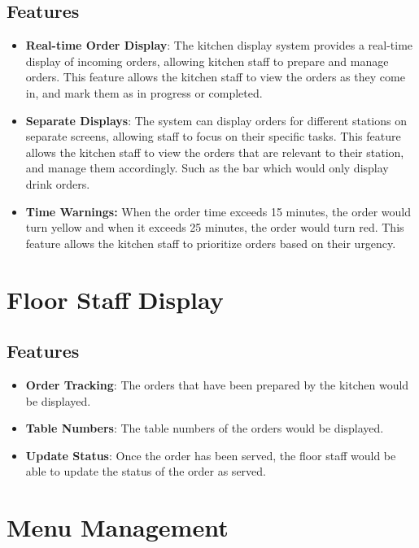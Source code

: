 \subsection{Features}
\begin{itemize}
    \item \textbf{Real-time Order Display}: The kitchen display system provides a real-time display of incoming orders, allowing kitchen staff to prepare and manage orders. This feature allows the kitchen staff to view the orders as they come in, and mark them as in progress or completed.
    \item \textbf{Separate Displays}: The system can display orders for different stations on separate screens, allowing staff to focus on their specific tasks. This feature allows the kitchen staff to view the orders that are relevant to their station, and manage them accordingly. Such as the bar which would only display drink orders.
    \item \textbf{Time Warnings:} When the order time exceeds 15 minutes, the order would turn yellow and when it exceeds 25 minutes, the order would turn red. This feature allows the kitchen staff to prioritize orders based on their urgency.
\end{itemize}

\section{Floor Staff Display}
\subsection{Features}
\begin{itemize}
    \item \textbf{Order Tracking}: The orders that have been prepared by the kitchen would be displayed.
    \item \textbf{Table Numbers}: The table numbers of the orders would be displayed.
    \item \textbf{Update Status}: Once the order has been served, the floor staff would be able to update the status of the order as served.
\end{itemize}

\section{Menu Management}
